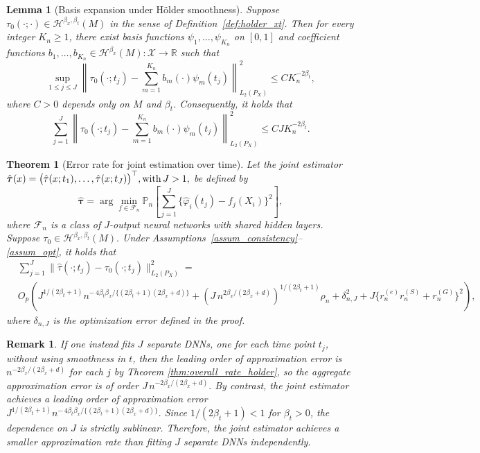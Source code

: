 \documentclass{article}
\newtheorem{theorem}{Theorem}
\newtheorem{remark}{Remark}
\newtheorem{lemma}{Lemma}
\begin{document}
 
 \begin{lemma}[Basis expansion under H\"older smoothness]\label{lem:time_basis_holder}
Suppose
\(
\tau_0(\cdot; \cdot) \in \mathcal H^{\beta_x,\beta_t}(M)
\)
in the sense of Definition~\ref{def:holder_xt}. Then for every integer \(K_n\ge 1\), there exist basis functions
\(\psi_1,\ldots,\psi_{K_n}\) on \([0,1]\) and coefficient functions
\(b_1,\ldots,b_{K_n} \in \mathcal H^{\beta_x}(M):\mathcal X\to\mathbb R\) such that
\[
\sup_{1\le j\le J}
\left\|
\tau_0(\cdot;t_j)-\sum_{m=1}^{K_n} b_m(\cdot)\psi_m(t_j)
\right\|_{L_2(P_X)}^2
\le
C K_n^{-2\beta_t},
\]
where \(C>0\) depends only on \(M\) and \(\beta_t\).
Consequently, it holds that
\[
\sum_{j=1}^J
\left\|
\tau_0(\cdot;t_j)-\sum_{m=1}^{K_n} b_m(\cdot)\psi_m(t_j)
\right\|_{L_2(P_X)}^2
\le
C J K_n^{-2\beta_t}.
\]
\end{lemma}

 
  \begin{theorem}[Error rate for joint estimation over time]\label{thm:joint_pseudo}
 Let the joint estimator
\(
\hat{\boldsymbol\tau}(x)
=
\bigl(\hat\tau(x;t_1),\ldots,\hat\tau(x;t_J)\bigr)^\top, {\rm with} \,  J>1, 
\)
be defined by
\[
\hat{\boldsymbol\tau}
=
\arg\min_{f\in\mathcal F_n}
\mathbb P_n\!\left[
\sum_{j=1}^J \{\hat\varphi_i(t_j)-f_j(X_i)\}^2
\right],
\]
where \(\mathcal F_n\) is a class of \(J\)-output neural networks with shared hidden layers. Suppose \(
    \tau_0 \in \mathcal H^{\beta_x,\beta_t}(M).
    \)
Under Assumptions~\ref{assum_consistency}--\ref{assum_opt},   
 it holds that 
\begin{align*}
& \sum_{j=1}^J
\|\hat\tau(\cdot;t_j)-\tau_0(\cdot;t_j)\|_{L_2(P_X)}^2
= \\
& O_p\!\left(
J^{1/(2\beta_t+1)}
n^{-\,4\beta_t\beta_x/\{(2\beta_t+1)(2\beta_x+d)\}}
+
\left(
J\,n^{2\beta_x/(2\beta_x+d)}
\right)^{1/(2\beta_t+1)}\rho_n
+
\delta_{n,J}^2
+
J\{r_n^{(e)}r_n^{(S)}+r_n^{(G)}\}^2
\right),
\end{align*}
 where $\delta_{n,J}$ is the optimization error defined in the proof.
 

 
\end{theorem}
\begin{remark} 
  If one instead fits \(J\) separate DNNs, one for each time point \(t_j\), without using smoothness in \(t\), then the leading order of  approximation error is 
\(
n^{-2\beta_x/(2\beta_x+d)}
\)
for each \(j\) by Theorem \ref{thm:overall_rate_holder}, so the aggregate approximation error is of order
\(
J\, n^{-2\beta_x/(2\beta_x+d)}.
\)
By contrast, the joint estimator achieves a leading order of approximation error
\(
J^{1/(2\beta_t+1)}
n^{-\,4\beta_t\beta_x/\{(2\beta_t+1)(2\beta_x+d)\}}.
\)
Since \(1/(2\beta_t+1)<1\) for \(\beta_t>0\), the dependence on \(J\) is strictly sublinear. Therefore, the joint estimator achieves a smaller approximation rate than fitting \(J\) separate DNNs independently.

\end{remark}
\end{document}
